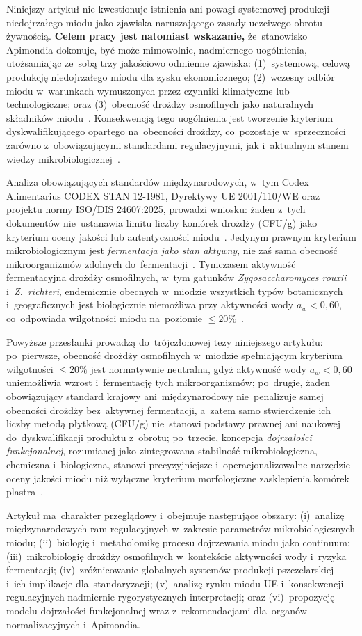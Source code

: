 Niniejszy artykuł nie kwestionuje istnienia ani powagi systemowej produkcji niedojrzałego miodu jako zjawiska naruszającego zasady
uczciwego obrotu żywnością. \textbf{Celem pracy jest natomiast wskazanie,}
że~stanowisko Apimondia dokonuje, być może mimowolnie, nadmiernego
uogólnienia, utożsamiając ze~sobą trzy jakościowo odmienne zjawiska:
(1)~systemową, celową produkcję niedojrzałego miodu dla zysku
ekonomicznego; (2)~wczesny odbiór miodu w~warunkach wymuszonych przez
czynniki klimatyczne lub technologiczne; oraz (3)~obecność drożdży
osmofilnych jako naturalnych składników miodu~\cite{garcia2025,munitis1976}.
Konsekwencją tego uogólnienia jest tworzenie kryterium dyskwalifikującego opartego na~obecności drożdży, co~pozostaje
w~sprzeczności zarówno z~obowiązującymi standardami regulacyjnymi, jak i~aktualnym stanem wiedzy mikrobiologicznej~\cite{codex_stan12, rodriguezmachado2024}.

Analiza obowiązujących standardów międzynarodowych, w~tym Codex
Alimentarius CODEX STAN 12-1981, Dyrektywy UE 2001/110/WE oraz
projektu normy ISO/DIS 24607:2025, prowadzi wniosku: żaden z~tych dokumentów nie~ustanawia limitu liczby komórek drożdży
(CFU/g) jako kryterium oceny jakości lub autentyczności miodu~\cite{codex_stan12}.
Jedynym prawnym kryterium mikrobiologicznym jest \emph{fermentacja jako stan aktywny}, nie zaś sama obecność
mikroorganizmów zdolnych do~fermentacji~\cite{codex_stan12}.
Tymczasem aktywność fermentacyjna drożdży osmofilnych, w~tym
gatunków \textit{Zygosaccharomyces rouxii} i~\textit{Z.~richteri},
endemicznie obecnych w~miodzie wszystkich typów botanicznych i~geograficznych jest biologicznie niemożliwa przy aktywności wody $a_w < 0{,}60$, co~odpowiada wilgotności miodu na~poziomie $\leq 20\%$~\cite{zamora2006}.

Powyższe przesłanki prowadzą do~trójczłonowej tezy niniejszego artykułu:
po~pierwsze, obecność drożdży osmofilnych w~miodzie spełniającym
kryterium wilgotności $\leq 20\%$ jest normatywnie neutralna, gdyż
aktywność wody $a_w < 0{,}60$ uniemożliwia wzrost i~fermentację tych
mikroorganizmów; po~drugie, żaden obowiązujący standard krajowy
ani~międzynarodowy nie~penalizuje samej obecności drożdży bez~aktywnej
fermentacji, a~zatem samo stwierdzenie ich liczby metodą płytkową (CFU/g)
nie~stanowi podstawy prawnej ani naukowej do~dyskwalifikacji produktu
z~obrotu; po~trzecie, koncepcja \emph{dojrzałości funkcjonalnej},
rozumianej jako zintegrowana stabilność mikrobiologiczna, chemiczna
i~biologiczna, stanowi precyzyjniejsze i~operacjonalizowalne narzędzie
oceny jakości miodu niż wyłączne kryterium morfologiczne zasklepienia
komórek plastra~\cite{zhang2021,guo2020,sun2021}.

Artykuł ma~charakter przeglądowy i~obejmuje następujące obszary:
(i)~analizę międzynarodowych ram regulacyjnych w~zakresie parametrów mikrobiologicznych miodu; 
(ii)~biologię i~metabolomikę procesu dojrzewania miodu jako continuum; 
(iii)~mikrobiologię drożdży osmofilnych w~kontekście aktywności wody i~ryzyka fermentacji; 
(iv)~zróżnicowanie globalnych systemów produkcji pszczelarskiej i~ich implikacje dla~standaryzacji; 
(v)~analizę rynku miodu UE i~konsekwencji regulacyjnych nadmiernie rygorystycznych interpretacji; oraz
(vi)~propozycję modelu dojrzałości funkcjonalnej wraz z~rekomendacjami dla~organów normalizacyjnych i~Apimondia.